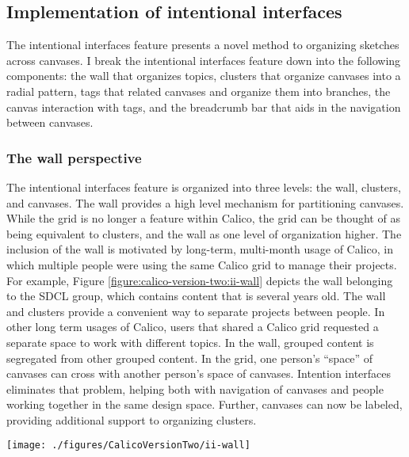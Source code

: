 \subsection{Implementation of intentional interfaces}

The intentional interfaces feature presents a novel method to organizing sketches across canvases. I break the intentional interfaces feature down into the following components: the wall that organizes topics, clusters that organize canvases into a radial pattern, tags that related canvases and organize them into branches, the canvas interaction with tags, and the breadcrumb bar that aids in the navigation between canvases.

\subsubsection{The wall perspective} 

The intentional interfaces feature is organized into three levels: the wall, clusters, and canvases. The wall provides a high level mechanism for partitioning canvases.  While the grid is no longer a feature within Calico, the grid can be thought of as being equivalent to clusters, and the wall as one level of organization higher. The inclusion of the wall is motivated by long-term, multi-month usage of Calico, in which multiple people were using the same Calico grid to manage their projects. For example, Figure \ref{figure:calico-version-two:ii-wall} depicts the wall belonging to the SDCL group, which contains content that is several years old. The wall and clusters provide a convenient way to separate projects between people. In other long term usages of Calico, users that shared a Calico grid requested a separate space to work with different topics. In the wall, grouped content is segregated from other grouped content. In the grid, one person's ``space'' of canvases can cross with another person’s space of canvases. Intention interfaces eliminates that problem, helping both with navigation of canvases and people working together in the same design space. Further, canvases can now be labeled, providing additional support to organizing clusters. 

\begin{figure*}[tbh]
  \centering
  \texttt{[image: ./figures/CalicoVersionTwo/ii-wall]}
  \caption{The Calico wall belonging to the SDCL group, which contains sketches that are several years old and are used by several group members regularly.}
  \label{figure:calico-version-two:ii-wall}
\end{figure*}

